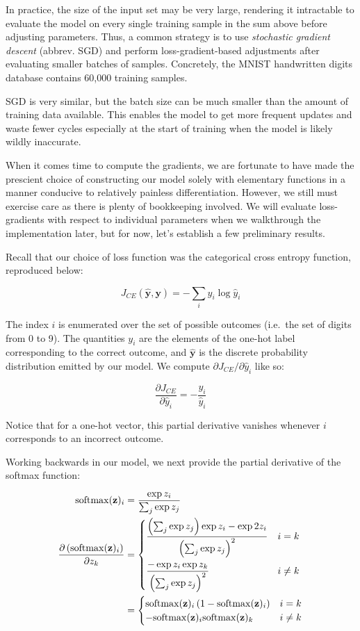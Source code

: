 In practice, the size of the input set may be very large, rendering it
intractable to evaluate the model on every single training sample in the
sum above before adjusting parameters. Thus, a common strategy is to use
\emph{stochastic gradient descent} (abbrev. SGD) and perform
loss-gradient-based adjustments after evaluating smaller batches of
samples. Concretely, the MNIST handwritten digits database contains
60,000 training samples. 

SGD is very similar, but the batch size can be much smaller than the
amount of training data available. This enables the model to get more
frequent updates and waste fewer cycles especially at the start of
training when the model is likely wildly inaccurate.

When it comes time to compute the gradients, we are fortunate to have
made the prescient choice of constructing our model solely with
elementary functions in a manner conducive to relatively painless
differentiation. However, we still must exercise care as there is plenty
of bookkeeping involved. We will evaluate loss-gradients with respect to
individual parameters when we walkthrough the implementation later, but
for now, let's establish a few preliminary results.

Recall that our choice of loss function was the categorical cross
entropy function, reproduced below:

\[J_{CE}(\mathbf{\hat{y}}, \mathbf{y}) = -\sum_{i} y_i \log{\hat{y}_i}\]

The index \(i\) is enumerated over the set of possible outcomes
(i.e.~the set of digits from 0 to 9). The quantities \(y_i\) are the
elements of the one-hot label corresponding to the correct outcome, and
\(\hat{\mathbf{y}}\) is the discrete probability distribution emitted by
our model. We compute \(\partial J_{CE}/\partial \hat{y}_i\) like so:

\[\frac{\partial J_{CE}}{\partial \hat{y}_i} = -\frac{y_i}{\hat{y}_i}\]

Notice that for a one-hot vector, this partial derivative vanishes
whenever \(i\) corresponds to an incorrect outcome.

Working backwards in our model, we next provide the partial derivative
of the softmax function:

\[
\begin{aligned}
	\mathrm{softmax}(\mathbf{z})_i &= \frac{\exp{z_i}}{\sum_j \exp{z_j}} \\
	\frac{\partial \left(\mathrm{softmax}(\mathbf{z})_i\right)}{\partial z_k} &=
	\begin{dcases}
		\frac{\left(\sum_j\exp{z_j}\right)\exp{z_i} - \exp{2z_i}}{\left(\sum_j\exp{z_j}\right)^2}& i = k \\
		\frac{-\exp{z_i}\exp{z_k}}{\left(\sum_j\exp{z_j}\right)^2}& i \neq k
	\end{dcases} \\
	&= \begin{cases}
		\mathrm{softmax}(\mathbf{z})_i\left(1 - \mathrm{softmax}(\mathbf{z})_i\right) & i = k \\
		-\mathrm{softmax}(\mathbf{z})_i \mathrm{softmax}(\mathbf{z})_k & i \neq k
	\end{cases}
\end{aligned}
\]

